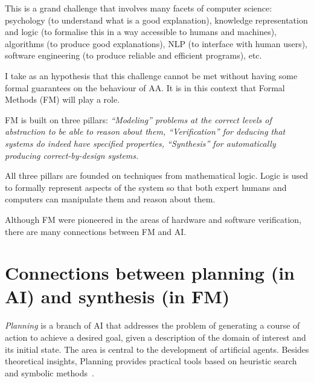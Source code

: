 \documentclass[10pt,a4paper,sans]{moderncv}
\begin{document}
This is a grand challenge that involves many facets of computer science: psychology (to understand what is a good explanation), 
knowledge representation and logic (to formalise this in a way accessible to humans and machines), 
algorithms (to produce good explanations), NLP (to interface 
with human users), software engineering (to produce reliable and efficient programs), etc.

I take as an hypothesis that this challenge cannot be met without having some formal guarantees on the behaviour 
of AA.  It is in this context that Formal Methods (FM) will play a role. 
\begin{framed}
\noindent FM is built on three pillars: 
\it
\- ``Modeling'' problems at the correct levels of abstraction to be able 
to reason about them,
\- ``Verification'' for deducing that systems do indeed have specified properties,
\- ``Synthesis'' for automatically producing correct-by-design systems. 
\ti
\end{framed}
All three pillars are founded on techniques from mathematical logic. Logic is used to formally represent aspects of the system so that both expert humans and computers can 
manipulate them and reason about them. 

Although FM were pioneered in the areas of hardware and software verification, there are many connections between FM and AI. 

% 


\section{Connections between planning (in AI) and synthesis (in FM)}

\emph{Planning} is a branch of AI that addresses the problem of generating a course of action to achieve
a desired goal, given a description of the domain of interest and its initial state. The area is central
to the development of artificial agents. Besides theoretical insights, Planning provides practical tools 
based on heuristic search and symbolic methods~\cite{GeBo}. 
\end{document}
